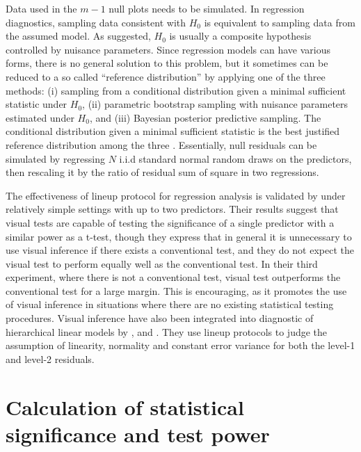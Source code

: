 \documentclass[]{interact}
\theoremstyle{plain}%
\theoremstyle{definition}
\theoremstyle{remark}
\begin{document}
Data used in the \(m - 1\) null plots needs to be simulated. In
regression diagnostics, sampling data consistent with \(H_0\) is
equivalent to sampling data from the assumed model. As
\citet{buja_statistical_2009} suggested, \(H_0\) is usually a composite
hypothesis controlled by nuisance parameters. Since regression models
can have various forms, there is no general solution to this problem,
but it sometimes can be reduced to a so called ``reference
distribution'' by applying one of the three methods: (i) sampling from a
conditional distribution given a minimal sufficient statistic under
\(H_0\), (ii) parametric bootstrap sampling with nuisance parameters
estimated under \(H_0\), and (iii) Bayesian posterior predictive
sampling. The conditional distribution given a minimal sufficient
statistic is the best justified reference distribution among the three
\citep{buja_statistical_2009}. Essentially, null residuals can be
simulated by regressing \(N\) i.i.d standard normal random draws on the
predictors, then rescaling it by the ratio of residual sum of square in
two regressions.

The effectiveness of lineup protocol for regression analysis is
validated by \citet{majumder_validation_2013} under relatively simple
settings with up to two predictors. Their results suggest that visual
tests are capable of testing the significance of a single predictor with
a similar power as a t-test, though they express that in general it is
unnecessary to use visual inference if there exists a conventional test,
and they do not expect the visual test to perform equally well as the
conventional test. In their third experiment, where there is not a
conventional test, visual test outperforms the conventional test for a
large margin. This is encouraging, as it promotes the use of visual
inference in situations where there are no existing statistical testing
procedures. Visual inference have also been integrated into diagnostic
of hierarchical linear models by \citet{loy2013diagnostic},
\citet{loy2014hlmdiag} and \citet{loy2015you}. They use lineup protocols
to judge the assumption of linearity, normality and constant error
variance for both the level-1 and level-2 residuals.

\hypertarget{calculation-of-statistical-significance-and-test-power}{%
\section{Calculation of statistical significance and test
power}\label{calculation-of-statistical-significance-and-test-power}}
\end{document}
